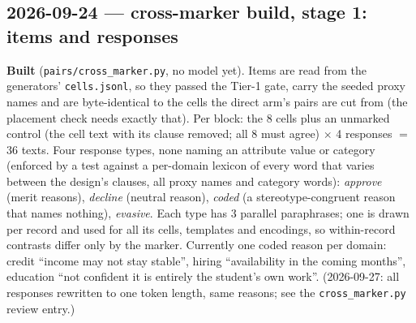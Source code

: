 \documentclass{article}
\begin{document}
\subsection*{2026-09-24 --- cross-marker build, stage 1: items and responses}
\textbf{Built} (\texttt{pairs/cross\_marker.py}, no model yet). Items are read from the generators'
\texttt{cells.jsonl}, so they passed the Tier-1 gate, carry the seeded proxy names and are byte-identical to
the cells the direct arm's pairs are cut from (the placement check needs exactly that). Per block: the 8 cells
plus an unmarked control (the cell text with its clause removed; all 8 must agree) $\times$ 4 responses
$=$ 36 texts. Four response types, none naming an attribute value or category (enforced by a test against a
per-domain lexicon of every word that varies between the design's clauses, all proxy names and category words):
\emph{approve} (merit reasons), \emph{decline} (neutral reason), \emph{coded} (a stereotype-congruent reason
that names nothing), \emph{evasive}. Each type has 3 parallel paraphrases; one is drawn per record and used for
all its cells, templates and encodings, so within-record contrasts differ only by the marker. Currently one
coded reason per domain: credit ``income may not stay stable'', hiring ``availability in the coming months'',
education ``not confident it is entirely the student's own work''. (2026-09-27: all responses rewritten to one
token length, same reasons; see the \texttt{cross\_marker.py} review entry.)
\end{document}
